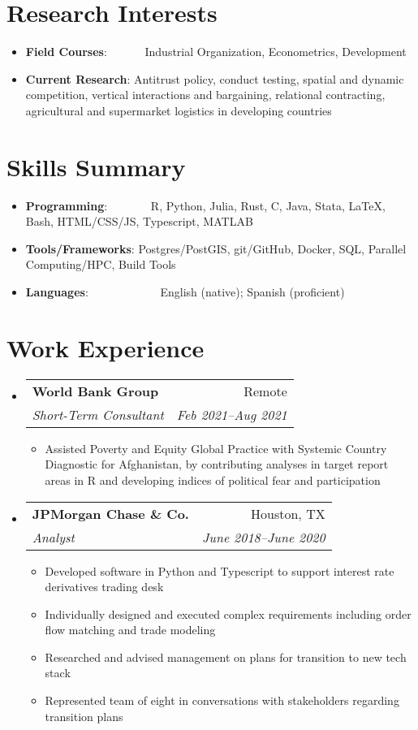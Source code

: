 \documentclass[a4paper,20pt]{article}
\makeatletter
\newcommand{\resumeItem}[2]{
  \item\small{
    \textbf{#1}{: #2 \vspace{-2pt}}
  }
}
\newcommand{\resumeSubheading}[4]{
  \vspace{-1pt}\item
    \begin{tabular*}{0.97\textwidth}{l@{\extracolsep{\fill}}r}
      \textbf{#1} & #2 \\
      \textit{#3} & \textit{#4} \\
    \end{tabular*}\vspace{-5pt}
}
\newcommand{\resumeSubItem}[2]{\resumeItem{#1}{#2}\vspace{-3pt}}
\newcommand{\resumeSubHeadingListStart}{\begin{itemize}[leftmargin=*]}
\newcommand{\resumeSubHeadingListEnd}{\end{itemize}}
\newcommand{\resumeItemListStart}{\begin{itemize}}
\newcommand{\resumeItemListEnd}{\end{itemize}\vspace{-5pt}}
\makeatother
\begin{document}
\section{Research Interests}
\begin{itemize}[leftmargin=*, itemindent=-9em]
  \resumeSubItem{Field Courses}{~~~~~~Industrial Organization, Econometrics, Development}
  \resumeSubItem{Current Research}{Antitrust policy, conduct testing, spatial and dynamic competition, vertical interactions and bargaining, relational contracting, agricultural and supermarket logistics in developing countries}
  \resumeSubHeadingListEnd
	    
\vspace{-5pt}
\section{Skills Summary}
	\resumeSubHeadingListStart
	\resumeSubItem{Programming}{~~~~~~~R, Python, Julia, Rust, C, Java, Stata, LaTeX, Bash, HTML/CSS/JS, Typescript, MATLAB}
	\resumeSubItem{Tools/Frameworks}{Postgres/PostGIS, git/GitHub, Docker, SQL, Parallel Computing/HPC, Build Tools}
	\resumeSubItem{Languages}{~~~~~~~~~~~~English (native); Spanish (proficient)}

\resumeSubHeadingListEnd
\vspace{-5pt}
\section{Work Experience}
  \resumeSubHeadingListStart
    \resumeSubheading{World Bank Group}{Remote}
    {Short-Term Consultant}{Feb 2021–Aug 2021}
    \resumeItemListStart
        \item Assisted Poverty and Equity Global Practice with Systemic Country Diagnostic for Afghanistan, by contributing analyses in target report areas in R and developing indices of political fear and participation
      \resumeItemListEnd
    \resumeSubheading
		{JPMorgan Chase \& Co.}{Houston, TX}
		{Analyst}{June 2018–June 2020}
		\resumeItemListStart
        \item 
          {Developed software in Python and Typescript to support interest rate derivatives trading desk}
        \item  
          {Individually designed and executed complex requirements including order flow matching and trade modeling}
        \item {Researched and advised management on plans for transition to new tech stack}
        \item Represented team of eight in conversations with stakeholders regarding transition plans
		\resumeItemListEnd


\end{itemize}
\end{document}
